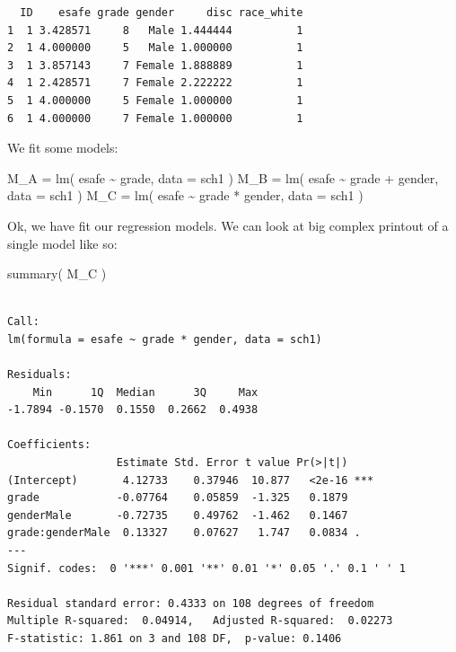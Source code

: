 \documentclass[
  letterpaper,
  DIV=11,
  numbers=noendperiod]{scrreprt}
\newenvironment{Shaded}{\begin{snugshade}}{\end{snugshade}}
\newcommand{\AttributeTok}[1]{\textcolor[rgb]{0.49,0.56,0.16}{#1}}
\newcommand{\FunctionTok}[1]{\textcolor[rgb]{0.02,0.16,0.49}{#1}}
\newcommand{\NormalTok}[1]{\textcolor[rgb]{0.00,0.44,0.13}{#1}}
\newcommand{\OtherTok}[1]{\textcolor[rgb]{0.00,0.44,0.13}{#1}}
\newcommand{\SpecialCharTok}[1]{\textcolor[rgb]{0.25,0.44,0.63}{#1}}
\begin{document}
\begin{verbatim}
  ID    esafe grade gender     disc race_white
1  1 3.428571     8   Male 1.444444          1
2  1 4.000000     5   Male 1.000000          1
3  1 3.857143     7 Female 1.888889          1
4  1 2.428571     7 Female 2.222222          1
5  1 4.000000     5 Female 1.000000          1
6  1 4.000000     7 Female 1.000000          1
\end{verbatim}

We fit some models:

\begin{Shaded}
\begin{Highlighting}[]
\NormalTok{M\_A }\OtherTok{=} \FunctionTok{lm}\NormalTok{( esafe }\SpecialCharTok{\textasciitilde{}}\NormalTok{ grade, }\AttributeTok{data =}\NormalTok{ sch1 )}
\NormalTok{M\_B }\OtherTok{=} \FunctionTok{lm}\NormalTok{( esafe }\SpecialCharTok{\textasciitilde{}}\NormalTok{ grade }\SpecialCharTok{+}\NormalTok{ gender, }\AttributeTok{data =}\NormalTok{ sch1 )}
\NormalTok{M\_C }\OtherTok{=} \FunctionTok{lm}\NormalTok{( esafe }\SpecialCharTok{\textasciitilde{}}\NormalTok{ grade }\SpecialCharTok{*}\NormalTok{ gender, }\AttributeTok{data =}\NormalTok{ sch1 )}
\end{Highlighting}
\end{Shaded}

Ok, we have fit our regression models. We can look at big complex
printout of a single model like so:

\begin{Shaded}
\begin{Highlighting}[]
\FunctionTok{summary}\NormalTok{( M\_C )}
\end{Highlighting}
\end{Shaded}

\begin{verbatim}

Call:
lm(formula = esafe ~ grade * gender, data = sch1)

Residuals:
    Min      1Q  Median      3Q     Max 
-1.7894 -0.1570  0.1550  0.2662  0.4938 

Coefficients:
                 Estimate Std. Error t value Pr(>|t|)    
(Intercept)       4.12733    0.37946  10.877   <2e-16 ***
grade            -0.07764    0.05859  -1.325   0.1879    
genderMale       -0.72735    0.49762  -1.462   0.1467    
grade:genderMale  0.13327    0.07627   1.747   0.0834 .  
---
Signif. codes:  0 '***' 0.001 '**' 0.01 '*' 0.05 '.' 0.1 ' ' 1

Residual standard error: 0.4333 on 108 degrees of freedom
Multiple R-squared:  0.04914,   Adjusted R-squared:  0.02273 
F-statistic: 1.861 on 3 and 108 DF,  p-value: 0.1406
\end{verbatim}
\end{document}
